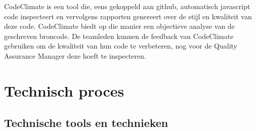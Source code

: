 \documentclass{article}
\begin{document}
\noindent CodeClimate is een tool die, eens gekoppeld aan github, automatisch javascript code inspecteert en vervolgens rapporten genereert over de stijl en kwaliteit van deze code. CodeClimate biedt op die manier een objectieve analyse van de geschreven broncode. De teamleden kunnen de feedback van CodeClimate gebruiken om de kwaliteit van hun code te verbeteren, nog voor de Quality Assurance Manager deze hoeft te inspecteren.  

 
\clearpage
 
 

\section{Technisch proces}

\subsection{Technische tools en technieken}
\end{document}
